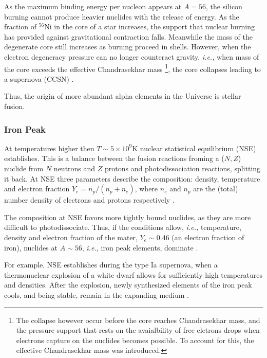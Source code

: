 \documentclass[11pt,a4paper,headinclude=true,DIV=14,BCOR=8mm,chapterprefix,listof=totoc,twoside,openright,abstracton]{scrbook}
\begin{document}
As the maximum binding energy per nucleon appears at $A=56$, the silicon burning cannot produce heavier nuclides with the release of energy. As the fraction of $^{56}$Ni in the core of a star increases, the support that nuclear burning has provided against gravitational contraction falls. Meanwhile the mass of the degenerate core still increases as burning proceed in shells. However, when the electron degeneracy pressure can no longer counteract gravity, \textit{i.e.,} when mass of the core exceeds the effective Chandrasekhar mass \footnote{The collapse however occur before the core reaches Chandrasekhar mass, and the pressure support that rests on the avaialbility of free eletrons drops when electrons capture on the nuclides becomes possible. To account for this, the effective Chandrasekhar mass was introduced.}, the core collapses leading to a supernova (CCSN) \cite{Woosley:2002}.

Thus, the origin of more abundant alpha elements in the Universe is stellar fusion.


\subsubsection{Iron Peak}

At temperatures higher then $T\sim 5\times10^{9}$K nuclear statistical equilibrium (NSE) establishes. This is a balance between the fusion reactions froming a ($N,Z$) nuclide from $N$ neutrons and $Z$ protons and photodissociation reactions, splitting it back. At NSE three parameters describe the composition: density, temperature and electron fraction $Y_e = n_p/(n_p + n_e)$, where $n_e$ and $n_p$ are the (total) number density of electrons and protons respectively \cite{Seitenzahl:2009}. 

The composition at NSE favors more tightly bound nuclides, as they are more difficult to photodissociate. Thus, if the conditions allow, \textit{i.e.,} temperature, density and electron fraction of the mater, $Y_e \sim 0.46$ (an electron fraction of iron), nuclides at $A\sim56$, \textit{i.e.,} iron peak elements, dominate \cite{Seitenzahl:2009}. 

For example, NSE establishes during the type Ia supernova, when a thermonuclear explosion of a white dwarf allows for sufficiently high temperatures and densities. After the explosion, newly synthesized elements of the iron peak cools, and being stable, remain in the expanding medium \cite{Iwamoto:2000as}. 
\end{document}
